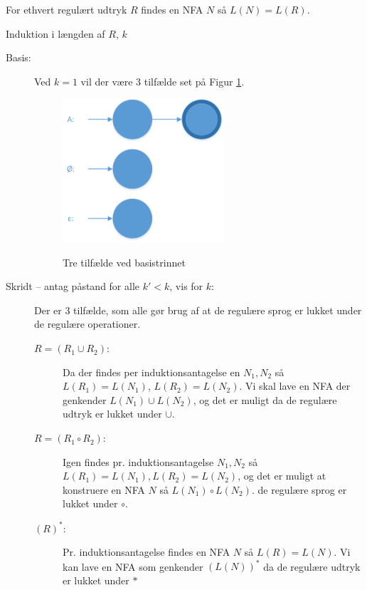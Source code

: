 \documentclass[a4paper,10pt,article]{memoir}
\begin{document}
\begin{saetning}
  For ethvert regulært udtryk $R$ findes en NFA $N$ så $L(N)=L(R)$.
\end{saetning}
\begin{bevis}

Induktion i længden af $R$, $k$

\begin{description}
\item[Basis:]
Ved $k=1$ vil der være 3 tilfælde set på Figur \ref{fig:fig1}.

\begin{figure}[H]%
{\centering 
\includegraphics[width=60mm]{Fig1x.png}
}
\caption{Tre tilfælde ved basistrinnet}
\label{fig:fig1}
\end{figure}

\item[Skridt -- antag påstand for alle $k'<k$, vis for $k$:] 
Der er 3 tilfælde, som alle gør brug af at de regulære sprog er lukket
under de regulære operationer.

\begin{description}
\item[$R = (R_1 \cup R_2)$:] Da der findes per induktionsantagelse en
  $N_1, N_2$ så $L(R_1)=L(N_1)$, $L(R_2)=L(N_2)$. Vi skal lave en NFA
  der genkender $L(N_1) \cup L(N_2)$, og det er muligt da de regulære
  udtryk er lukket under $\cup$. 
\item[$R = (R_1 \circ R_2)$:] Igen findes pr. induktionsantagelse
  $N_1, N_2$ så $L(R_1) = L(N_1), L(R_2)=L(N_2)$, og det er muligt at
  konstruere en NFA $N$ så $L(N_1) \circ L(N_2)$.
  de regulære sprog er lukket under $\circ$.
\item[$(R)^*$:] Pr. induktionsantagelse findes en NFA $N$ så
  $L(R)=L(N)$. Vi kan lave en NFA som genkender $(L(N))^*$ da de
  regulære udtryk er lukket under $*$
\end{description}
\end{description}
\end{bevis}
\end{document}
